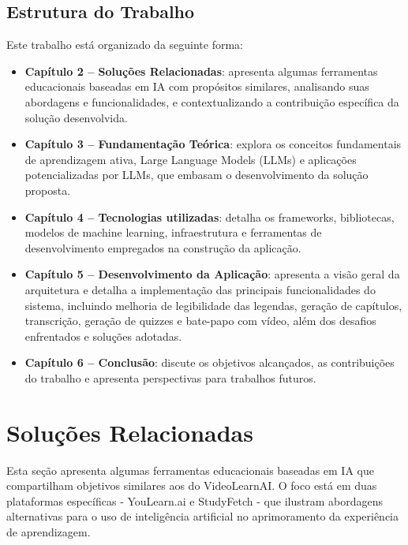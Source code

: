 \documentclass[tcc,capa]{texufpel}
\begin{document}
\section{Estrutura do Trabalho}
Este trabalho está organizado da seguinte forma:

\begin{itemize}
    \item \textbf{Capítulo 2 – Soluções Relacionadas}: apresenta algumas ferramentas educacionais baseadas em IA com propósitos similares, analisando suas abordagens e funcionalidades, e contextualizando a contribuição específica da solução desenvolvida.
    
    \item \textbf{Capítulo 3 – Fundamentação Teórica}: explora os conceitos fundamentais de aprendizagem ativa, Large Language Models (LLMs) e aplicações potencializadas por LLMs, que embasam o desenvolvimento da solução proposta.
    
    \item \textbf{Capítulo 4 – Tecnologias utilizadas}: detalha os frameworks, bibliotecas, modelos de machine learning, infraestrutura e ferramentas de desenvolvimento empregados na construção da aplicação.
    
    \item \textbf{Capítulo 5 – Desenvolvimento da Aplicação}: apresenta a visão geral da arquitetura e detalha a implementação das principais funcionalidades do sistema, incluindo melhoria de legibilidade das legendas, geração de capítulos, transcrição, geração de quizzes e bate-papo com vídeo, além dos desafios enfrentados e soluções adotadas.
    
    \item \textbf{Capítulo 6 – Conclusão}: discute os objetivos alcançados, as contribuições do trabalho e apresenta perspectivas para trabalhos futuros.
\end{itemize}




\chapter{Soluções Relacionadas}

Esta seção apresenta algumas ferramentas educacionais baseadas em IA que compartilham objetivos similares aos do VideoLearnAI. O foco está em duas plataformas específicas - YouLearn.ai e StudyFetch - que ilustram abordagens alternativas para o uso de inteligência artificial no aprimoramento da experiência de aprendizagem.
\end{document}
